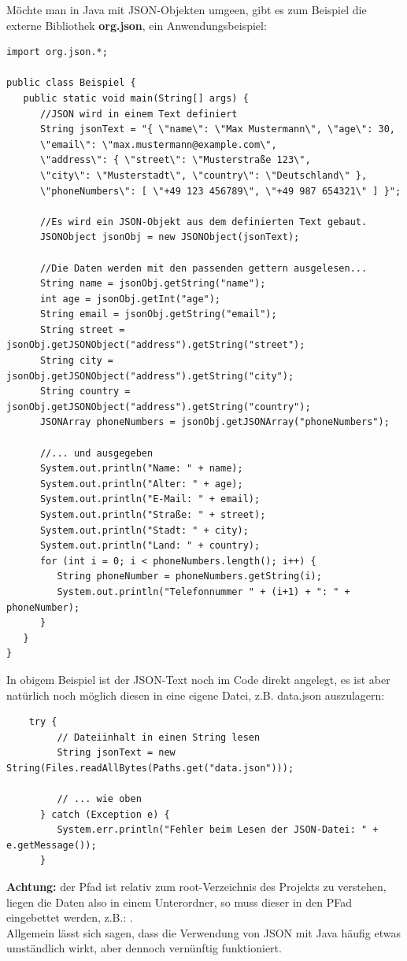 \documentclass{article}
\begin{document}
Möchte man in Java mit JSON-Objekten umgeen, gibt es zum Beispiel die externe Bibliothek \textbf{org.json}, ein Anwendungsbeispiel: 

\begin{verbatim}
import org.json.*;

public class Beispiel {
   public static void main(String[] args) {
      //JSON wird in einem Text definiert
      String jsonText = "{ \"name\": \"Max Mustermann\", \"age\": 30, 
      \"email\": \"max.mustermann@example.com\",
      \"address\": { \"street\": \"Musterstraße 123\",
      \"city\": \"Musterstadt\", \"country\": \"Deutschland\" },
      \"phoneNumbers\": [ \"+49 123 456789\", \"+49 987 654321\" ] }";
      
      //Es wird ein JSON-Objekt aus dem definierten Text gebaut. 
      JSONObject jsonObj = new JSONObject(jsonText);
      
      //Die Daten werden mit den passenden gettern ausgelesen...
      String name = jsonObj.getString("name");
      int age = jsonObj.getInt("age");
      String email = jsonObj.getString("email");
      String street = jsonObj.getJSONObject("address").getString("street");
      String city = jsonObj.getJSONObject("address").getString("city");
      String country = jsonObj.getJSONObject("address").getString("country");
      JSONArray phoneNumbers = jsonObj.getJSONArray("phoneNumbers");
      
      //... und ausgegeben
      System.out.println("Name: " + name);
      System.out.println("Alter: " + age);
      System.out.println("E-Mail: " + email);
      System.out.println("Straße: " + street);
      System.out.println("Stadt: " + city);
      System.out.println("Land: " + country);
      for (int i = 0; i < phoneNumbers.length(); i++) {
         String phoneNumber = phoneNumbers.getString(i);
         System.out.println("Telefonnummer " + (i+1) + ": " + phoneNumber);
      }
   }
}
\end{verbatim}
\newpage

In obigem Beispiel ist der JSON-Text noch im Code direkt angelegt, es ist aber natürlich noch möglich diesen in eine eigene Datei, z.B. data.json auszulagern: 
\begin{verbatim}
    try {
         // Dateiinhalt in einen String lesen
         String jsonText = new String(Files.readAllBytes(Paths.get("data.json")));
         
         // ... wie oben
      } catch (Exception e) {
         System.err.println("Fehler beim Lesen der JSON-Datei: " + e.getMessage());
      }
\end{verbatim}
\textbf{Achtung:} der Pfad ist relativ zum root-Verzeichnis des Projekts zu verstehen, liegen die Daten also in einem Unterordner, so muss dieser in den PFad eingebettet werden, z.B.: . \\
Allgemein lässt sich sagen, dass die Verwendung von JSON mit Java häufig etwas umständlich wirkt, aber dennoch vernünftig funktioniert.  \\
\end{document}
